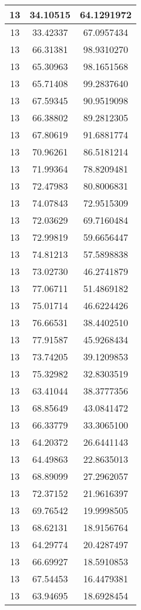 \documentclass[
]{book}
\begin{document}
\begin{tabular}{c|c|c}
\hline
13 & 34.10515 & 64.1291972\\
\hline
13 & 33.42337 & 67.0957434\\
\hline
13 & 66.31381 & 98.9310270\\
\hline
13 & 65.30963 & 98.1651568\\
\hline
13 & 65.71408 & 99.2837640\\
\hline
13 & 67.59345 & 90.9519098\\
\hline
13 & 66.38802 & 89.2812305\\
\hline
13 & 67.80619 & 91.6881774\\
\hline
13 & 70.96261 & 86.5181214\\
\hline
13 & 71.99364 & 78.8209481\\
\hline
13 & 72.47983 & 80.8006831\\
\hline
13 & 74.07843 & 72.9515309\\
\hline
13 & 72.03629 & 69.7160484\\
\hline
13 & 72.99819 & 59.6656447\\
\hline
13 & 74.81213 & 57.5898838\\
\hline
13 & 73.02730 & 46.2741879\\
\hline
13 & 77.06711 & 51.4869182\\
\hline
13 & 75.01714 & 46.6224426\\
\hline
13 & 76.66531 & 38.4402510\\
\hline
13 & 77.91587 & 45.9268434\\
\hline
13 & 73.74205 & 39.1209853\\
\hline
13 & 75.32982 & 32.8303519\\
\hline
13 & 63.41044 & 38.3777356\\
\hline
13 & 68.85649 & 43.0841472\\
\hline
13 & 66.33779 & 33.3065100\\
\hline
13 & 64.20372 & 26.6441143\\
\hline
13 & 64.49863 & 22.8635013\\
\hline
13 & 68.89099 & 27.2962057\\
\hline
13 & 72.37152 & 21.9616397\\
\hline
13 & 69.76542 & 19.9998505\\
\hline
13 & 68.62131 & 18.9156764\\
\hline
13 & 64.29774 & 20.4287497\\
\hline
13 & 66.69927 & 18.5910853\\
\hline
13 & 67.54453 & 16.4479381\\
\hline
13 & 63.94695 & 18.6928454\\

\end{tabular}
\end{document}

